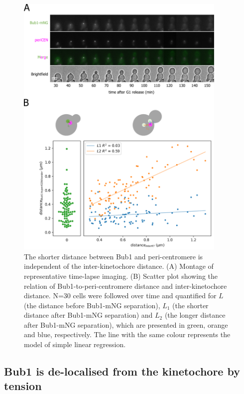 \begin{figure}[htbp]
  \centering
  \includegraphics[width=0.9\textwidth]{figures/Bub1-mNG peri-cen.pdf}
  \caption[The shorter distance between Bub1 and peri-centromere is independent of the inter-kinetochore distance]{The shorter distance between Bub1 and peri-centromere is independent of the inter-kinetochore distance. (A) Montage of representative time-lapse imaging. (B) Scatter plot showing the relation of Bub1-to-peri-centromere distance and inter-kinetochore distance. N=30 cells were followed over time and quantified for $L$ (the distance before Bub1-mNG separation), $L_{1}$ (the shorter distance after Bub1-mNG separation) and $L_{2}$ (the longer distance after Bub1-mNG separation), which are presented in green, orange and blue, respectively. The line with the same colour represents the model of simple linear regression. }
  \label{fig:periCEN}
\end{figure} 


\subsection{Bub1 is de-localised from the kinetochore by tension}

